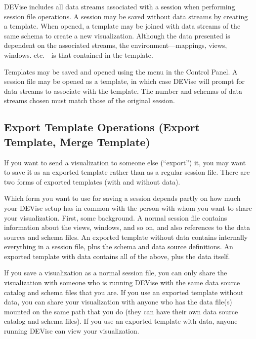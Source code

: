 DEVise includes all data streams associated with a session when performing
session file operations. A session may be saved without data streams by creating a
template. When opened, a template may be joined with data streams of the same
schema to create a new visualization. Although the data presented is dependent
on the associated streams, the environment---mappings, views, windows. etc.---is
that contained in the template.

Templates may be saved and opened using the  menu in the Control
Panel. A session file may be opened as a template, in which case DEVise will
prompt for data streams to associate with the template. The number and schemas
of data streams chosen must match those of the original session.


\subsection{Export Template Operations (Export Template, Merge Template)}

If you want to send a visualization to someone else (``export'') it, you
may want to save it as an exported template rather than as a regular session
file.  There are two forms of exported templates (with and without data).

Which form you want to use for saving a session depends partly on how
much your DEVise setup has in common with the person with whom you want to
share your visualization.  First, some background.  A normal session file
contains information about the views, windows, and so on, and also references
to the data sources and schema files.  An exported template without data
contains internally everything in a session file, plus the schema and data
source definitions.  An exported template with data contains all of the
above, plus the data itself.

If you save a visualization as a normal session file, you can only share
the visualization with someone who is running DEVise with the same data
source catalog and schema files that you are.  If you use an exported
template without data, you can share your visualization with anyone who
has the data file(s) mounted on the same path that you do (they can have
their own data source catalog and schema files).  If you use an exported
template with data, anyone running DEVise can view your visualization.

